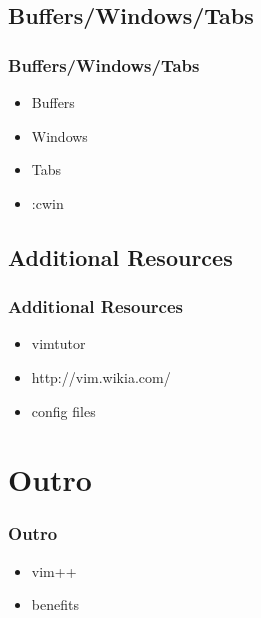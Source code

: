 \documentclass{beamer}
\begin{document}
\subsection{Buffers/Windows/Tabs}
\frame
{
    \frametitle{Buffers/Windows/Tabs}

    \begin{itemize}
        \item Buffers
        \item Windows
        \item Tabs
        \item :cwin
    \end{itemize}
}

\subsection{Additional Resources}
\frame
{
    \frametitle{Additional Resources}

    \begin{itemize}
        \item vimtutor
        \item http://vim.wikia.com/
        \item config files
    \end{itemize}
}

\section{Outro}
\frame
{
    \frametitle{Outro}

    \begin{itemize}
        \item vim++
        \item benefits
    \end{itemize}
}
\end{document}
